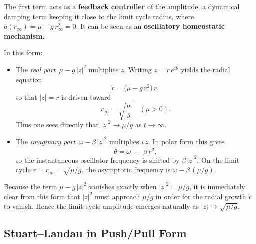 The first term acts as a \textbf{feedback controller} of the amplitude, a dynamical damping term keeping it close to the limit cycle radius, where $a(r_\infty)=\mu - g\,r_\infty^2=0$. It can be seen as an \textbf{oscillatory homeostatic mechanism.}


In this form:
\begin{itemize}
  \item The \emph{real part} \(\,\mu - g\,\lvert z\rvert^2\) multiplies \(z\).  Writing \(z = r\,e^{i\theta}\) yields the radial equation
  \[
  \dot r = \bigl(\mu - g\,r^2\bigr)\,r,
  \]
  so that \(\lvert z\rvert = r\) is driven toward 
  \[
  r_{\infty} = \sqrt{\frac{\mu}{\,g\,}}\quad(\mu>0).
  \]
  Thus one sees directly that \(\lvert z\rvert^2\to \mu/g\) as \(t\to\infty\).

  \item The \emph{imaginary part} \(\,\omega - \beta\,\lvert z\rvert^2\) multiplies \(i\,z\).  In polar form this gives
  \[
  \dot\theta = \omega \;-\; \beta\,r^2,
  \]
  so the instantaneous oscillator frequency is shifted by \(\beta\,\lvert z\rvert^2\).  On the limit cycle \(r = r_{\infty}=\sqrt{\mu/g}\), the asymptotic frequency is \(\omega - \beta\,(\mu/g)\).
\end{itemize}

Because the term \(\mu - g\,\lvert z\rvert^2\) vanishes exactly when \(\lvert z\rvert^2 = \mu/g\), it is immediately clear from this form that \(\lvert z\rvert^2\) must approach \(\mu/g\) in order for the radial growth \(\dot r\) to vanish.  Hence the limit‐cycle amplitude emerges naturally as \(\lvert z\rvert \to \sqrt{\mu/g}\).  


\subsection{Stuart–Landau in Push/Pull Form}


